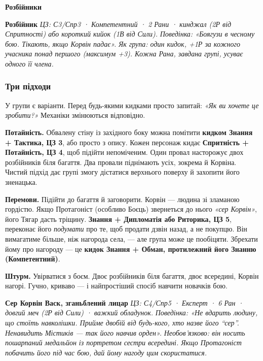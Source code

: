\documentclass[10pt,a4paper]{article}
\begin{document}
\par\smallskip\begin{rpgnote}[fontupper=\normalfont]\textbf{Розбійники}\par\smallskip \textbf{Розбійник} \emph{ЦЗ: С3/Спр3 · Компетентний · 2 Рани · кинджал (2Р від Спритності) або короткий кийок (1В від Сили).} \emph{Поведінка: «Боягузи в чесному бою. Тікають, якщо Корвін падає».} \emph{Як група: один кидок, +1Р за кожного учасника понад першого (максимум +3). Кожна Рана, завдана групі, усуває одного її члена.}\end{rpgnote}\par\smallskip
\subsubsection{Три підходи}\label{ux442ux440ux438-ux43fux456ux434ux445ux43eux434ux438}

У групи є варіанти. Перед будь-якими кидками просто запитай: \emph{«Як ви хочете це зробити?»} Механіки змінюються відповідно.

\textbf{Потайність.} Обвалену стіну із західного боку можна помітити \textbf{кидком Знання + Тактика, ЦЗ 3}, або просто з опису. Кожен персонаж кидає \textbf{Спритність + Потайність, ЦЗ 4}, щоб підійти непоміченим. Один провал насторожує двох розбійників біля багаття. Два провали піднімають усіх, зокрема й Корвіна. Чистий підхід дає групі змогу дістатися верхнього поверху й захопити його зненацька.

\par{}\noindent\textbf{Перемови.} Підійти до багаття й заговорити. Корвін --- людина зі зламаною гордістю. Якщо Протагоніст (особливо Боєць) звернеться до нього \emph{«сер Корвін»}, його Тягар дасть тріщину. \textbf{Знання + Дипломатія або Риторика, ЦЗ 5}, переконає його \emph{подумати} про те, щоб продати дзвін назад, а не покупцю. Він вимагатиме більше, ніж нагорода села, --- але група може це пообіцяти. Збрехати йому про нагороду --- це \textbf{кидок Знання + Обман, протилежний його Знанню (Компетентний)}.

\textbf{Штурм.} Увірватися з боєм. Двоє розбійників біля багаття, двоє всередині, Корвін нагорі. Гучно, криваво --- і найпростіший спосіб навчити новачків бою.

\par\smallskip\begin{rpgnote}[fontupper=\normalfont]\textbf{Сер Корвін Васк, зганьблений лицар} \emph{ЦЗ: С4/Спр5 · Експерт · 6 Ран · довгий меч (2Р від Сили) · важкий обладунок.} \emph{Поведінка: «Не вдарить людину, що стоїть навколішки. Прийме двобій від будь-кого, хто назве його “сер”. Ненавидить Містиків --- так його навчив орден».} \emph{Необов’язково: він носить пошарпаний медальйон із портретом сестри всередині. Якщо Протагоніст побачить його під час бою, дай йому нагоду цим скористатися.}\end{rpgnote}\par\smallskip
\end{document}
